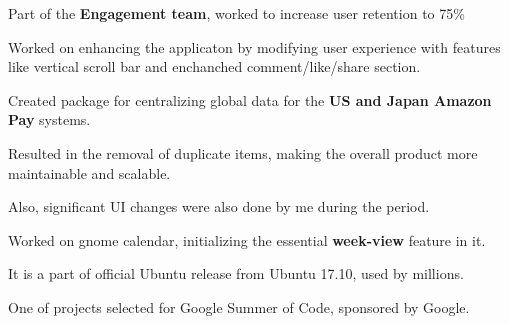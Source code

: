 \documentclass[a4paper]{deedy-resume} %
\begin{document}
\begin{minipage}[t]{0.66\textwidth}
\sectionspace %



\begin{tightitemize}
\item Part of the \textbf{Engagement team}, worked to increase user retention to 75\%
\item Worked on enhancing the applicaton by modifying user experience with features like vertical scroll bar and enchanched comment/like/share section.
\end{tightitemize}

\sectionspace %



\begin{tightitemize}
\item Created package for centralizing global data for the \textbf{US and Japan Amazon Pay} systems.
\item Resulted in the removal of duplicate items, making the overall product more maintainable and scalable.
\item Also, significant UI changes were also done by me during the period.
\end{tightitemize}

\sectionspace %



\begin{tightitemize}
\item Worked on gnome calendar, initializing the essential \textbf{week-view} feature in it.
\item It is a part of official Ubuntu release from Ubuntu 17.10, used by millions.
\item One of projects selected for Google Summer of Code, sponsored by Google.
\end{tightitemize}

\sectionspace %


\end{minipage}
\end{document}
